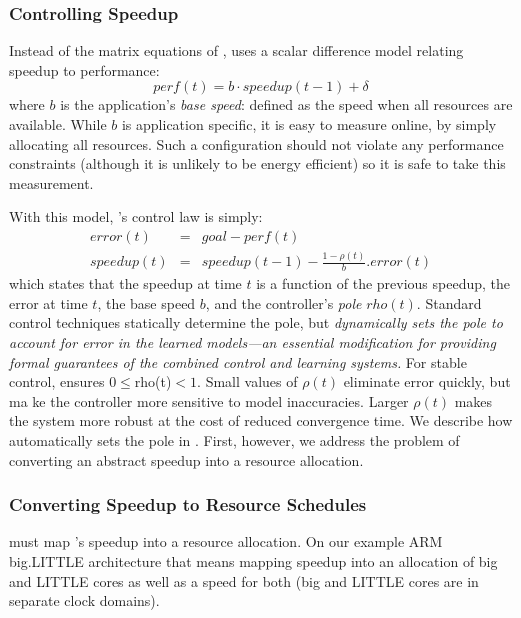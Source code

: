 
\subsubsection{Controlling Speedup}
Instead of the matrix equations of , \SYSTEM{}
uses a scalar difference model relating speedup to performance:
\begin{equation}
  perf(t) = b \cdot speedup(t-1) + \delta \label{eqn:speedup}
\end{equation}
where $b$ is the application's \emph{base speed}: defined as the speed
when all resources are available.  While $b$ is application specific,
it is easy to measure online, by simply allocating all resources. Such
a configuration should not violate any performance constraints
(although it is unlikely to be energy efficient) so it is safe to take
this measurement.

With this model, \SYSTEM{}'s control law is simply:
\begin{eqnarray}
  error(t) &=& goal - perf(t) \label{eqn:speedup-error} \\
  speedup(t) &=& speedup(t-1) - \frac{1 - \rho(t)}{b}.error(t)
  \label{eqn:speedup-control}
\end{eqnarray}
which states that the speedup at time $t$ is a function of the
previous speedup, the error at time $t$, the base speed $b$, and the
controller's \emph{pole} $rho(t)$.  Standard control techniques
statically determine the pole, but \SYSTEM{} \emph{dynamically sets
  the pole to account for error in the learned models---an essential
  modification for providing formal guarantees of the combined control
  and learning systems.}  For stable control, \SYSTEM{} ensures $ 0
\le $rho(t)$ < 1$. Small values of $\rho(t)$ eliminate error quickly,
but ma ke the controller more sensitive to model inaccuracies.  Larger
$\rho(t)$ makes the system more robust at the cost of reduced
convergence time.  We describe how \SYSTEM{} automatically sets the
pole in .  First, however, we address the problem
of converting an abstract speedup into a resource allocation.

\subsubsection{Converting Speedup to Resource Schedules}
\SYSTEM{} must map 's speedup into a resource
allocation.  On our example ARM big.LITTLE architecture that means
mapping speedup into an allocation of big and LITTLE cores as well as
a speed for both (big and LITTLE cores are in separate clock domains).

